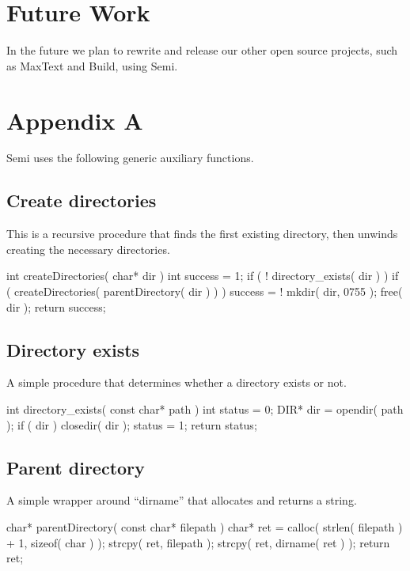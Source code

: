 \documentclass[]{article}
\begin{document}
\section{	Future Work}

In the future we plan to rewrite and release our other open source projects, such as MaxText and Build, using Semi.

\section*{	Appendix A}

Semi uses the following generic auxiliary functions.

\subsection{	Create directories}

This is a recursive procedure that finds the first existing directory, then unwinds creating the necessary directories.

\begin{verbatimtab}
int createDirectories( char* dir )
{
	int success = 1;
	if ( ! directory_exists( dir ) )
	{
		if ( createDirectories( parentDirectory( dir ) ) )
		{
			success = ! mkdir( dir, 0755 );
		}
	}
	free( dir );
	return success;
}

\end{verbatimtab}
\subsection{	Directory exists}

A simple procedure that determines whether a directory exists or not.

\begin{verbatimtab}
int directory_exists( const char* path )
{
	int status = 0;
	DIR* dir = opendir( path );
	if ( dir )
	{
		closedir( dir );
		status = 1;
	}
	return status;
}

\end{verbatimtab}
\subsection{	Parent directory}

A simple wrapper around ``dirname'' that allocates and returns a string.

\begin{verbatimtab}
char* parentDirectory( const char* filepath )
{
	char* ret = calloc( strlen( filepath ) + 1, sizeof( char ) );
	{
		strcpy( ret, filepath );
		strcpy( ret, dirname( ret ) );
	}
	return ret;
}

\end{verbatimtab}
\end{document}
